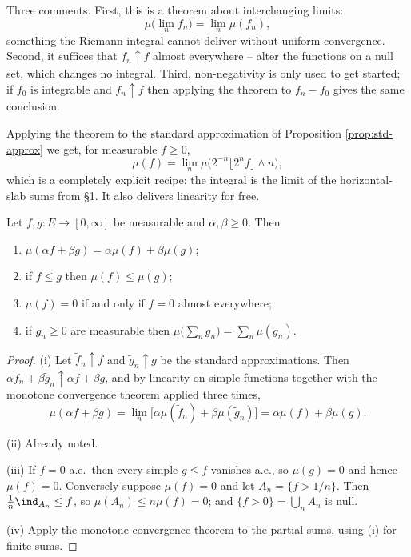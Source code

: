 \begin{remark}
	Three comments. First, this is a theorem about interchanging limits:
	$$
	\mu\big(\lim_n f_n\big) = \lim_n \mu(f_n),
	$$
	something the Riemann integral cannot deliver without uniform convergence. Second, it suffices that $f_n \uparrow f$ almost everywhere -- alter the functions on a null set, which changes no integral. Third, non-negativity is only used to get started; if $f_0$ is integrable and $f_n \uparrow f$ then applying the theorem to $f_n - f_0$ gives the same conclusion.
\end{remark}

Applying the theorem to the standard approximation of Proposition \ref{prop:std-approx} we get, for measurable $f \geq 0$,
$$
\mu(f) = \lim_n \mu\big( 2^{-n}\lfloor 2^n f\rfloor \wedge n \big),
$$
which is a completely explicit recipe: the integral is the limit of the horizontal-slab sums from \S1. It also delivers linearity for free.

\begin{theorem}\label{thm:int-nonneg}
	Let $f, g : E \to [0,\infty]$ be measurable and $\alpha, \beta \geq 0$. Then
	\begin{enumerate}[label=(\roman*)]
		\item $\mu(\alpha f + \beta g) = \alpha \mu(f) + \beta\mu(g)$;
		\item if $f \leq g$ then $\mu(f) \leq \mu(g)$;
		\item $\mu(f) = 0$ if and only if $f = 0$ almost everywhere;
		\item if $g_n \geq 0$ are measurable then $\mu\big(\sum_n g_n\big) = \sum_n \mu(g_n)$.
	\end{enumerate}
\end{theorem}
\begin{proof}
	(i) Let $\tilde f_n \uparrow f$ and $\tilde g_n \uparrow g$ be the standard approximations. Then $\alpha \tilde f_n + \beta\tilde g_n \uparrow \alpha f + \beta g$, and by linearity on simple functions together with the monotone convergence theorem applied three times,
	$$
	\mu(\alpha f + \beta g) = \lim_n \big[\alpha\mu(\tilde f_n) + \beta \mu(\tilde g_n)\big] = \alpha\mu(f)+\beta\mu(g).
	$$

	(ii) Already noted.

	(iii) If $f = 0$ a.e.\ then every simple $g \leq f$ vanishes a.e., so $\mu(g)=0$ and hence $\mu(f)=0$. Conversely suppose $\mu(f)=0$ and let $A_n = \{f > 1/n\}$. Then $\frac1n \ind_{A_n} \leq f$, so $\mu(A_n) \leq n\mu(f) = 0$; and $\{f>0\} = \bigcup_n A_n$ is null.

	(iv) Apply the monotone convergence theorem to the partial sums, using (i) for finite sums.
\end{proof}

